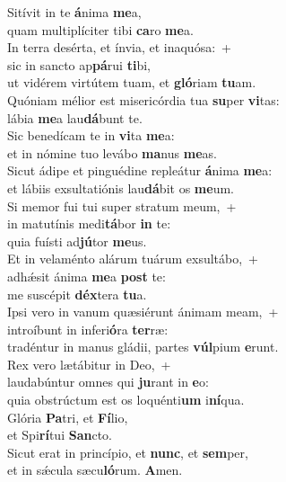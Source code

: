 \evenverse Sitívit in te \textbf{á}nima \textbf{me}a,~\*\\
\evenverse quam multiplíciter tibi \textbf{ca}ro \textbf{me}a.\\
\oddverse In terra desérta, et ínvia, et inaquósa:~+\\
\oddverse  sic in sancto ap\textbf{pá}rui \textbf{ti}bi,~\*\\
\oddverse ut vidérem virtútem tuam, et \textbf{gló}riam \textbf{tu}am.\\
\evenverse Quóniam mélior est misericórdia tua \textbf{su}per \textbf{vi}tas:~\*\\
\evenverse lábia \textbf{me}a lau\textbf{dá}bunt te.\\
\oddverse Sic benedícam te in \textbf{vi}ta \textbf{me}a:~\*\\
\oddverse et in nómine tuo levábo \textbf{ma}nus \textbf{me}as.\\
\evenverse Sicut ádipe et pinguédine repleátur \textbf{á}nima \textbf{me}a:~\*\\
\evenverse et lábiis exsultatiónis lau\textbf{dá}bit os \textbf{me}um.\\
\oddverse Si memor fui tui super stratum meum,~+\\
\oddverse  in matutínis medi\textbf{tá}bor \textbf{in} te:~\*\\
\oddverse quia fuísti ad\textbf{jú}tor \textbf{me}us.\\
\evenverse Et in velaménto alárum tuárum exsultábo,~+\\
\evenverse  adhǽsit ánima \textbf{me}a \textbf{post} te:~\*\\
\evenverse me suscépit \textbf{déx}tera \textbf{tu}a.\\
\oddverse Ipsi vero in vanum quæsiérunt ánimam meam,~+\\
\oddverse  introíbunt in inferi\textbf{ó}ra \textbf{ter}ræ:~\*\\
\oddverse tradéntur in manus gládii, partes \textbf{vúl}pium \textbf{e}runt.\\
\evenverse Rex vero lætábitur in Deo,~+\\
\evenverse  laudabúntur omnes qui \textbf{ju}rant in \textbf{e}o:~\*\\
\evenverse quia obstrúctum est os loquénti\textbf{um} i\textbf{ní}qua.\\
\oddverse Glória \textbf{Pa}tri, et \textbf{Fí}lio,~\*\\
\oddverse et Spi\textbf{rí}tui \textbf{San}cto.\\
\evenverse Sicut erat in princípio, et \textbf{nunc}, et \textbf{sem}per,~\*\\
\evenverse et in sǽcula sæcu\textbf{ló}rum. \textbf{A}men.\\
